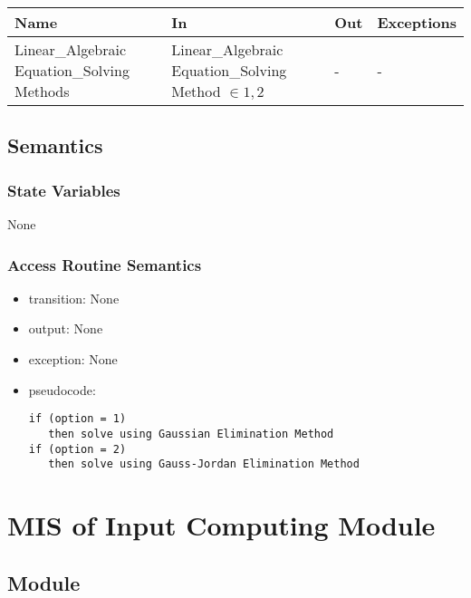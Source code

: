 \documentclass[12pt, titlepage]{article}
\begin{document}
\begin{center}
\begin{tabular}{p{4cm} p{4cm} p{2cm} p{2cm}}
\hline
\textbf{Name} & \textbf{In} & \textbf{Out} & \textbf{Exceptions} \\
\hline
Linear\_Algebraic Equation\_Solving Methods & Linear\_Algebraic
Equation\_Solving Method $\in {1, 2}$& - & - \\

\hline
\end{tabular}
\end{center}

\subsection{Semantics}

\subsubsection{State Variables}

None


\subsubsection{Access Routine Semantics}

\noindent %
\begin{itemize}
\item transition: None %
\item output: None%
\item exception: None%
\item pseudocode: 
\begin{lstlisting}
if (option = 1)
   then solve using Gaussian Elimination Method
if (option = 2)
   then solve using Gauss-Jordan Elimination Method 
\end{lstlisting}
\end{itemize}

\newpage


\section{MIS of {Input Computing Module}} \label{modic} %

\subsection{Module}
\end{document}
